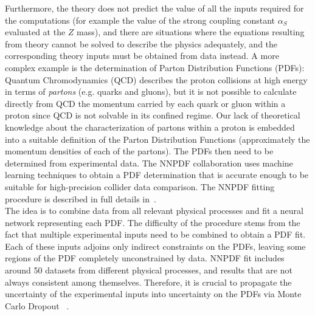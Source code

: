 Furthermore, the theory does not predict the value of all the inputs required for the computations (for example the
value of the strong coupling constant $\alpha_S$ evaluated at the $Z$ mass), and there are situations where the equations
resulting from theory cannot be solved to describe the physics adequately, and the corresponding theory inputs must be obtained from data instead. A more complex example is the determination of Parton Distribution Functions (PDFs): Quantum Chromodynamics (QCD) describes the proton collisions at high energy in terms of \emph{partons} (e.g. quarks and gluons), but it is not possible to calculate directly from QCD the momentum carried by each quark or gluon within a proton since QCD is not solvable in its confined regime. Our lack of theoretical knowledge about the characterization of
partons within a proton is embedded into a suitable definition of the Parton Distribution Functions (approximately the momentum densities of each of the partons). The PDFs then need to be determined from experimental data. The NNPDF collaboration uses machine learning techniques to obtain a PDF determination that is accurate enough to be suitable for high-precision collider data comparison. The NNPDF fitting procedure is described in full details in~\cite{Ball:2014uwa}.\\

The idea is to combine data from all relevant physical processes and fit a neural network representing each PDF. The difficulty of the procedure stems from the fact that multiple experimental inputs need to be combined to obtain
a PDF fit. Each of these inputs adjoins only indirect constraints on the PDFs, leaving some regions of the PDF
completely unconstrained by data. NNPDF fit includes around 50 datasets from different physical processes, and results that are not always consistent among themselves. Therefore, it is crucial to propagate the uncertainty of the experimental inputs into uncertainty on the PDFs via Monte Carlo Dropout ~\cite{2015arXiv150602142G}.\\

